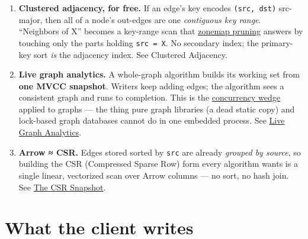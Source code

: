 \documentclass[
  11pt,
  openany]{book}
\begin{document}
\begin{enumerate}
\def\labelenumi{\arabic{enumi}.}
\item
  \textbf{Clustered adjacency, for free.} If an edge's key encodes
  \texttt{(src,\ dst)} src-major, then all of a node's out-edges are one
  \emph{contiguous key range}. ``Neighbors of X'' becomes a key-range
  scan that \href{../engine/storage.md}{zonemap pruning} answers by
  touching only the parts holding \texttt{src\ =\ X}. No secondary
  index; the primary-key sort \emph{is} the adjacency index. See
  Clustered Adjacency.
\item
  \textbf{Live graph analytics.} A whole-graph algorithm builds its
  working set from \textbf{one MVCC snapshot}. Writers keep adding
  edges; the algorithm sees a consistent graph and runs to completion.
  This is the \href{../engine/mvcc.md}{concurrency wedge} applied to
  graphs --- the thing pure graph libraries (a dead static copy) and
  lock-based graph databases cannot do in one embedded process. See
  \href{snapshot.md}{Live Graph Analytics}.
\item
  \textbf{Arrow ≈ CSR.} Edges stored sorted by \texttt{src} are already
  \emph{grouped by source}, so building the CSR (Compressed Sparse Row)
  form every algorithm wants is a single linear, vectorized scan over
  Arrow columns --- no sort, no hash join. See \href{snapshot.md}{The
  CSR Snapshot}.
\end{enumerate}

\section{What the client writes}\label{what-the-client-writes}
\end{document}
